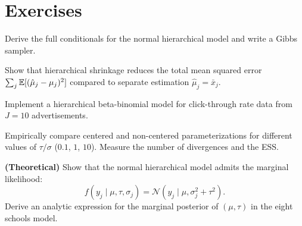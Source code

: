 \section{Exercises}

\begin{exercise}
Derive the full conditionals for the normal hierarchical model and
write a Gibbs sampler.
\end{exercise}

\begin{exercise}
Show that hierarchical shrinkage reduces the total mean squared error
$\sum_j \mathbb{E}[(\hat{\mu}_j - \mu_j)^2]$ compared to separate estimation
$\hat{\mu}_j = \bar{x}_j$.
\end{exercise}

\begin{exercise}
Implement a hierarchical beta-binomial model for click-through rate
data from $J = 10$ advertisements.
\end{exercise}

\begin{exercise}
Empirically compare centered and non-centered parameterizations for
different values of $\tau/\sigma$ ($0.1$, $1$, $10$). Measure the
number of divergences and the ESS.
\end{exercise}

\begin{exercise}
\textbf{(Theoretical)} Show that the normal hierarchical model admits
the marginal likelihood:
\[
  f(y_j \mid \mu, \tau, \sigma_j)
  = \mathcal{N}(y_j \mid \mu, \sigma_j^2 + \tau^2).
\]
Derive an analytic expression for the marginal posterior of
$(\mu, \tau)$ in the eight schools model.
\end{exercise}
